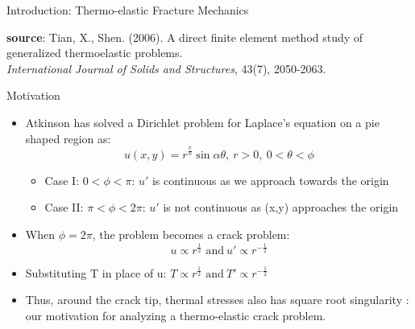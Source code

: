 \documentclass{beamer}
\begin{document}
\begin{frame}[t,fragile]{Introduction: Thermo-elastic Fracture Mechanics}
\begin{itemize}
\begin{figure}[H]
\begin{subfigure}{0.45\textwidth}
 \end{subfigure}
 \end{figure}
 \end{itemize}
 \vspace{.1cm}
   \tiny
   \hspace{15pt}
    \textbf{source}: Tian, X., Shen. (2006). A direct finite element method study of generalized thermoelastic problems. \\
   \vspace{-7pt}
   \hspace{15pt}
   \emph{International Journal of Solids and Structures}, 43(7), 2050-2063.
\end{frame}
\begin{frame}[t,fragile]{Motivation}
    \vspace{-.3cm}
    \footnotesize
\begin{itemize}
    \item Atkinson has solved a Dirichlet problem for Laplace's equation on a pie shaped region as:\vspace{-.2cm}
        $$u(x,y)= r^{\frac{\pi}{\phi}}\sin\alpha\theta,\  r>0,\ 0<\theta<\phi$$
        \vspace{-.6cm}
        \begin{itemize}
                \footnotesize
    \item Case I: $0<\phi<\pi$:
        $u'$ is continuous as we approach towards the origin 
    \item Case II: $\pi<\phi<2\pi$:
        $u'$ is not continuous as (x,y) approaches the origin 
    \end{itemize}
\item When $\phi=2\pi$, the problem becomes a crack problem:
    \vspace{-.1cm}$$u \propto r^{\frac{1}{2}}\text{ and} \ u'\propto  r^{-\frac{1}{2}}$$ 
    \item Substituting T in place of u: 
       $T \propto r^{\frac{1}{2}}\text{ and} \ T'\propto  r^{-\frac{1}{2}}$ 
   \item Thus, around the crack tip, thermal stresses also has square root singularity : our motivation for analyzing a thermo-elastic crack problem. 
    

\end{itemize}
\end{frame}
\end{document}
